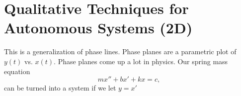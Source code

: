 \newpage
\section{Qualitative Techniques for Autonomous Systems (2D)}
This is a generalization of phase lines. Phase planes are a parametric plot of $y(t)$ vs. $x(t)$. Phase planes come up a lot in physics. Our spring mass equation \[
mx''+bx'+kx=c
,\] can be turned into a system if we let $y=x'$
